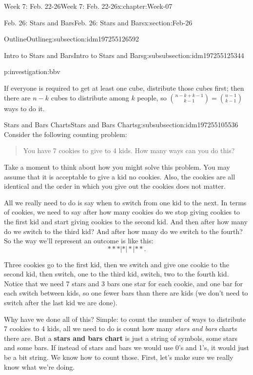 \documentclass[oneside,10pt,]{book}
\newcommand{\terminology}[1]{\textbf{#1}}
\numberwithin{equation}{section}
\begin{document}
\begin{chapterptx}{Week 7: Feb. 22-26}{}{Week 7: Feb. 22-26}{}{}{x:chapter:Week-07}
\begin{sectionptx}{Feb. 26: Stars and Bars}{}{Feb. 26: Stars and Bars}{}{}{x:section:Feb-26}
\begin{subsectionptx}{Outline}{}{Outline}{}{}{g:subsection:idm197255126592}
\begin{subsubsectionptx}{Intro to Stars and Bars}{}{Intro to Stars and Bars}{}{}{g:subsubsection:idm197255125344}
\begin{investigation}{}{p:investigation:bbv}
\par
If everyone is required to get at least one cube, distribute those cubes first; then there are \(n-k\) cubes to distribute among \(k\) people, so \(\binom{n-k+k-1}{k-1} = \binom{n-1}{k-1}\) ways to do it.%
\end{investigation}%
\end{subsubsectionptx}
%
%
\typeout{************************************************}
\typeout{************************************************}
%
\begin{subsubsectionptx}{Stars and Bars Charts}{}{Stars and Bars Charts}{}{}{g:subsubsection:idm197255105536}
Consider the following counting problem:%
\begin{quote}%
You have 7 cookies to give to 4 kids. How many ways can you do this?%
\end{quote}
Take a moment to think about how you might solve this problem. You may assume that it is acceptable to give a kid no cookies. Also, the cookies are all identical and the order in which you give out the cookies does not matter.%
\par
All we really need to do is say when to switch from one kid to the next. In terms of cookies, we need to say after how many cookies do we stop giving cookies to the first kid and start giving cookies to the second kid. And then after how many do we switch to the third kid? And after how many do we switch to the fourth? So the way we'll represent an outcome is like this:%
\begin{equation*}
***|*|*|**\text{.}
\end{equation*}
%
\par
Three cookies go to the first kid, then we switch and give one cookie to the second kid, then switch, one to the third kid, switch, two to the fourth kid. Notice that we need 7 stars and 3 bars \textendash{} one star for each cookie, and one bar for each switch between kids, so one fewer bars than there are kids (we don't need to switch after the last kid \textendash{} we are done).%
\par
Why have we done all of this? Simple: to count the number of ways to distribute 7 cookies to 4 kids, all we need to do is count how many \emph{stars and bars} charts there are. But a \terminology{stars and bars chart}  is just a string of symbols, some stars and some bars. If instead of stars and bars we would use 0's and 1's, it would just be a bit string.  We know how to count those. First, let's make sure we really know what we're doing.%

\end{subsubsectionptx}
\end{subsectionptx}
\end{sectionptx}
\end{chapterptx}
\end{document}
